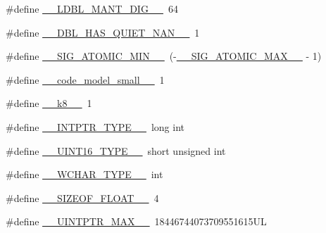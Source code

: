 \begin{DoxyCompactItemize}
\item 
\#define \hyperlink{build-analizer__host-_desktop___qt__5__9__0___g_c_c__64bit-debug_2moc__predefs_8h_a3c8df97b7413f417379377b604d060f5}{\+\_\+\+\_\+\+L\+D\+B\+L\+\_\+\+M\+A\+N\+T\+\_\+\+D\+I\+G\+\_\+\+\_\+}~64
\item 
\#define \hyperlink{build-analizer__host-_desktop___qt__5__9__0___g_c_c__64bit-debug_2moc__predefs_8h_a5e816b71154141be2784accabcdc0ead}{\+\_\+\+\_\+\+D\+B\+L\+\_\+\+H\+A\+S\+\_\+\+Q\+U\+I\+E\+T\+\_\+\+N\+A\+N\+\_\+\+\_\+}~1
\item 
\#define \hyperlink{build-analizer__host-_desktop___qt__5__9__0___g_c_c__64bit-debug_2moc__predefs_8h_aa39266a3f430ebcd4a4374e7a815e23f}{\+\_\+\+\_\+\+S\+I\+G\+\_\+\+A\+T\+O\+M\+I\+C\+\_\+\+M\+I\+N\+\_\+\+\_\+}~(-\/\hyperlink{build-analizer__host-_desktop___qt__5__9__0___g_c_c__64bit-_release_2moc__predefs_8h_a9e75b72378b039587e4fc4006776826d}{\+\_\+\+\_\+\+S\+I\+G\+\_\+\+A\+T\+O\+M\+I\+C\+\_\+\+M\+A\+X\+\_\+\+\_\+} -\/ 1)
\item 
\#define \hyperlink{build-analizer__host-_desktop___qt__5__9__0___g_c_c__64bit-debug_2moc__predefs_8h_ac045b6c5c8c7e9a0208818a2c0b4b2c2}{\+\_\+\+\_\+code\+\_\+model\+\_\+small\+\_\+\+\_\+}~1
\item 
\#define \hyperlink{build-analizer__host-_desktop___qt__5__9__0___g_c_c__64bit-debug_2moc__predefs_8h_a3ee6b6578d683a0e44bc3b4d2a7425e4}{\+\_\+\+\_\+k8\+\_\+\+\_\+}~1
\item 
\#define \hyperlink{build-analizer__host-_desktop___qt__5__9__0___g_c_c__64bit-debug_2moc__predefs_8h_a4ca36196b9f45fa67a0b23c43c658aa1}{\+\_\+\+\_\+\+I\+N\+T\+P\+T\+R\+\_\+\+T\+Y\+P\+E\+\_\+\+\_\+}~long int
\item 
\#define \hyperlink{build-analizer__host-_desktop___qt__5__9__0___g_c_c__64bit-debug_2moc__predefs_8h_a4c0e7daf2ae663a4f96693468bbb279f}{\+\_\+\+\_\+\+U\+I\+N\+T16\+\_\+\+T\+Y\+P\+E\+\_\+\+\_\+}~short unsigned int
\item 
\#define \hyperlink{build-analizer__host-_desktop___qt__5__9__0___g_c_c__64bit-debug_2moc__predefs_8h_a4f41dbe213ea9662c1fb0f5af562e363}{\+\_\+\+\_\+\+W\+C\+H\+A\+R\+\_\+\+T\+Y\+P\+E\+\_\+\+\_\+}~int
\item 
\#define \hyperlink{build-analizer__host-_desktop___qt__5__9__0___g_c_c__64bit-debug_2moc__predefs_8h_a4bd7bc94412d84b84388c574770b4549}{\+\_\+\+\_\+\+S\+I\+Z\+E\+O\+F\+\_\+\+F\+L\+O\+A\+T\+\_\+\+\_\+}~4
\item 
\#define \hyperlink{build-analizer__host-_desktop___qt__5__9__0___g_c_c__64bit-debug_2moc__predefs_8h_a1a2ed956349884193c07233d3cc40560}{\+\_\+\+\_\+\+U\+I\+N\+T\+P\+T\+R\+\_\+\+M\+A\+X\+\_\+\+\_\+}~18446744073709551615\+U\+L

\end{DoxyCompactItemize}
